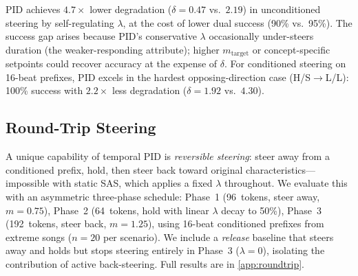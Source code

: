 \documentclass{article}
\theoremstyle{plain}
\begin{document}

PID achieves $4.7{\times}$ lower degradation ($\delta{=}0.47$ vs.\ $2.19$) in unconditioned steering by self-regulating $\lambda$, at the cost of lower dual success (90\% vs.\ 95\%). The success gap arises because PID's conservative $\lambda$ occasionally under-steers duration (the weaker-responding attribute); higher $m_\text{target}$ or concept-specific setpoints could recover accuracy at the expense of $\delta$. For conditioned steering on 16-beat prefixes, PID excels in the hardest opposing-direction case (H/S$\to$L/L): 100\% success with $2.2{\times}$ less degradation ($\delta{=}1.92$ vs.\ $4.30$).

\subsection{Round-Trip Steering}
\label{sec:roundtrip}

A unique capability of temporal PID is \emph{reversible steering}: steer away from a conditioned prefix, hold, then steer back toward original characteristics---impossible with static SAS, which applies a fixed $\lambda$ throughout. We evaluate this with an asymmetric three-phase schedule: Phase~1 (96~tokens, steer away, $m{=}0.75$), Phase~2 (64~tokens, hold with linear $\lambda$ decay to 50\%), Phase~3 (192~tokens, steer back, $m{=}1.25$), using 16-beat conditioned prefixes from extreme songs ($n{=}20$ per scenario). We include a \emph{release} baseline that steers away and holds but stops steering entirely in Phase~3 ($\lambda{=}0$), isolating the contribution of active back-steering. Full results are in \cref{app:roundtrip}.
\end{document}
